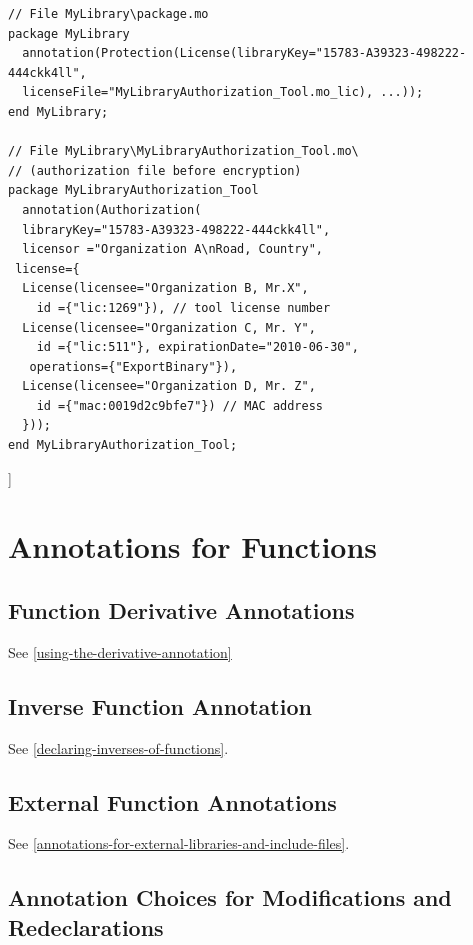 \documentclass[10pt,a4paper]{report}
\def\doublelabel#1{\label{#1}}
\begin{document}
\begin{lstlisting}[language=modelica]
// File MyLibrary\package.mo
package MyLibrary
  annotation(Protection(License(libraryKey="15783-A39323-498222-444ckk4ll",
  licenseFile="MyLibraryAuthorization_Tool.mo_lic), ...));
end MyLibrary;

// File MyLibrary\MyLibraryAuthorization_Tool.mo\
// (authorization file before encryption)
package MyLibraryAuthorization_Tool
  annotation(Authorization(
  libraryKey="15783-A39323-498222-444ckk4ll",
  licensor ="Organization A\nRoad, Country",
 license={
  License(licensee="Organization B, Mr.X",
    id ={"lic:1269"}), // tool license number
  License(licensee="Organization C, Mr. Y",
    id ={"lic:511"}, expirationDate="2010-06-30",
   operations={"ExportBinary"}),
  License(licensee="Organization D, Mr. Z",
    id ={"mac:0019d2c9bfe7"}) // MAC address
  }));
end MyLibraryAuthorization_Tool;
\end{lstlisting}
{]}

\section{Annotations for Functions}\doublelabel{annotations-for-functions}

\subsection{Function Derivative Annotations}\doublelabel{function-derivative-annotations}

See \ref{using-the-derivative-annotation}

\subsection{Inverse Function Annotation}\doublelabel{inverse-function-annotation}

See \ref{declaring-inverses-of-functions}.

\subsection{External Function Annotations}\doublelabel{external-function-annotations}

See \ref{annotations-for-external-libraries-and-include-files}.

\subsection{Annotation Choices for Modifications and Redeclarations}\doublelabel{annotation-choices-for-modifications-and-redeclarations}
\end{document}
